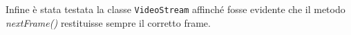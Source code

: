 \documentclass[a4paper,11pt]{article}
\begin{document}
	Infine è stata testata la classe \texttt{VideoStream} affinché fosse evidente che il metodo \textit{nextFrame()} restituisse sempre il corretto frame.
	
	
\end{document}
